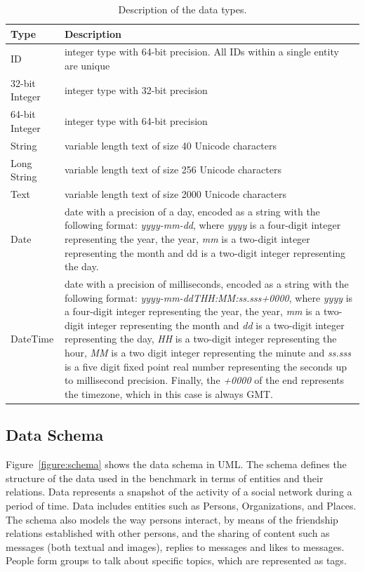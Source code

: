 \begin{table}[h]
\centering
\begin{tabular}{|p{\attributecolumn}|p{\largedescriptioncolumn}|}
    \hline
    \textbf{Type} & \textbf{Description} \\
    \hline
    ID &  integer type with 64-bit precision. All IDs within a single entity are unique\\
    \hline
    32-bit Integer &  integer type with 32-bit precision\\
    \hline
    64-bit Integer &  integer type with 64-bit precision\\
    \hline
    String & variable length text of size 40 Unicode characters\\
    \hline
    Long String & variable length text of size 256 Unicode characters\\
    \hline
    Text &  variable length text of size 2000 Unicode characters\\
    \hline
    Date &  date with a precision of a day, encoded as a string with the following format: \textit{yyyy-mm-dd}, where \textit{yyyy} is a four-digit integer representing the year,
    the year, \textit{mm} is a two-digit integer representing the month and dd is a two-digit integer representing the day. \\
    \hline
    DateTime &  date with a precision of milliseconds, encoded as a string with the following format: \textit{yyyy-mm-ddTHH:MM:ss.sss+0000}, where \textit{yyyy} is a four-digit integer representing the year,
    the year, \textit{mm} is a two-digit integer representing the month and \textit{dd} is a two-digit integer representing the day, \textit{HH} is a two-digit integer representing the hour, \textit{MM} is a two
    digit integer representing the minute and \textit{ss.sss} is a five digit fixed point real number representing the seconds up to millisecond precision. Finally, the \textit{+0000} of the end represents the
    timezone, which in this case is always GMT.\\
    \hline
\end{tabular}
\caption{Description of the data types.}
\label{table:types}
\end{table}


\subsection{Data Schema}

Figure~\ref{figure:schema} shows the data schema in UML. The schema defines the
structure of the data used in the benchmark in terms of entities and their
relations. Data represents a snapshot of the activity of a social network
during a period of time. Data includes entities such as Persons, Organizations,
and Places. The schema also models the way persons interact, by means of the
friendship relations established with other persons, and the sharing of content
such as messages (both textual and images), replies to messages and likes to
messages.  People form groups to talk about specific topics, which are
represented as tags.

